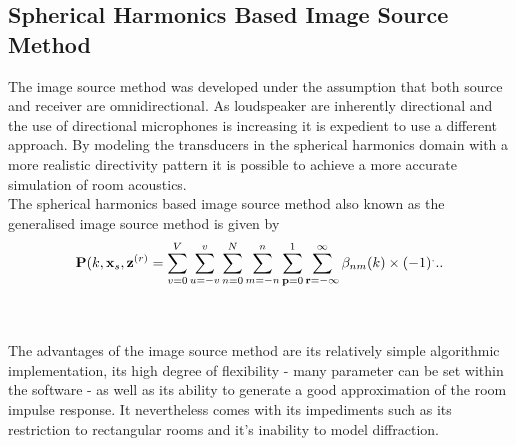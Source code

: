 \subsection{Spherical Harmonics Based Image Source Method}
The image source method was developed under the assumption that both source and receiver are omnidirectional. As loudspeaker are inherently directional and the use of directional microphones is increasing it is expedient to use a different approach. By modeling the transducers in the spherical harmonics domain with a more realistic directivity pattern it is possible to achieve a more accurate simulation of room acoustics.\cite{Samarasinghe2018}\\
The spherical harmonics based image source method also known as the generalised image source method is given by
\begin{equation}
    \mathbf{P}(k,\mathbf{x}_s,\mathbf{z}^{(r)} = \sum_{v=0}^V\sum_{u=-v}^v\sum_{n=0}^N\sum_{m=-n}^n\sum_{\mathbf{p}=0}^1\sum_{\mathbf{r}=-\infty}^\infty\beta_{nm}(k)\\
    \times (-1)^...
\end{equation}

\\
\\The advantages of the image source method are its relatively simple algorithmic implementation, its high degree of flexibility - many parameter can be set within the software - as well as its ability to generate a good approximation of the room impulse response. It nevertheless comes with its impediments such as its restriction to rectangular rooms and it's inability to model diffraction.\cite{Samarasinghe2018}